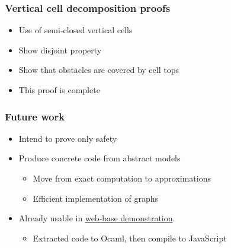 \documentclass[compress]{beamer}
\begin{document}
\begin{frame}
\frametitle{Vertical cell decomposition proofs}
\begin{itemize}
\item Use of semi-closed vertical cells
\item Show disjoint property
\item Show that obstacles are covered by cell tops
\item This proof is complete
\end{itemize}
\end{frame}
\begin{frame}
\frametitle{Future work}
\begin{itemize}
\item Intend to prove only safety
\item Produce concrete code from abstract models
\begin{itemize}
\item Move from exact computation to approximations
\item Efficient implementation of graphs
\end{itemize}
\item Already usable in \textcolor{blue}{\href{https://stamp.gitlabpages.inria.fr/trajectories.html}{web-base demonstration}.}
\begin{itemize}
\item Extracted code to Ocaml, then compile to JavaScript
\end{itemize}
\end{itemize}
\end{frame}
\end{document}
